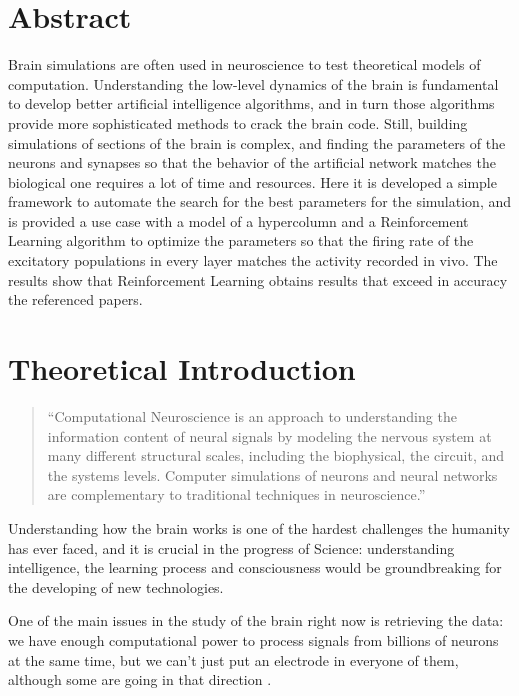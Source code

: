 \section{Abstract}

Brain simulations are often used in neuroscience to test theoretical models of computation. Understanding the low-level dynamics of the brain is fundamental to develop better artificial intelligence algorithms, and in turn those algorithms provide more sophisticated methods to crack the brain code. 
Still, building simulations of sections of the brain is complex, and finding the parameters of the neurons and synapses so that the behavior of the artificial network matches the biological one requires a lot of time and resources.
Here it is developed a simple framework to automate the search for the best parameters for the simulation, and is provided a use case with a model of a hypercolumn and a Reinforcement Learning algorithm to optimize the parameters so that the firing rate of the excitatory populations in every layer matches the activity recorded in vivo.
The results show that Reinforcement Learning obtains results that exceed in accuracy the referenced papers.

\section{Theoretical Introduction}
\begin{quote}
``Computational Neuroscience is an approach to understanding the information content of neural signals by modeling the nervous system at many different structural scales, including the biophysical, the circuit, and the systems levels. Computer simulations of neurons and neural networks are complementary to traditional techniques in neuroscience.''
\begin{flushright}
\cite[Series Foreword]{dayan}
\end{flushright}
\end{quote}
Understanding how the brain works is one of the hardest challenges the humanity has ever faced, and it is crucial in the progress of Science: understanding intelligence, the learning process and consciousness would be groundbreaking for the developing of new technologies.

One of the main issues in the study of the brain right now is retrieving the data: we have enough computational power to process signals from billions of neurons at the same time, but we can't just put an electrode in everyone of them, although some are going in that direction \cite{neuralink}. 

